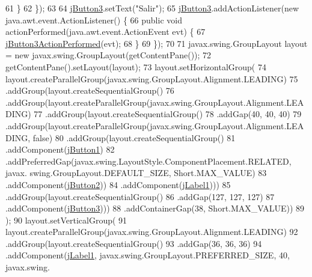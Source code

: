 \begin{DoxyCode}
61             \}
62         \});
63 
64         \mbox{\hyperlink{class_r_m_i_1_1_modulo_control_af7702c5fb7079fd87c45617ca34997d2}{jButton3}}.setText(\textcolor{stringliteral}{"Salir"});
65         \mbox{\hyperlink{class_r_m_i_1_1_modulo_control_af7702c5fb7079fd87c45617ca34997d2}{jButton3}}.addActionListener(\textcolor{keyword}{new} java.awt.event.ActionListener() \{
66             \textcolor{keyword}{public} \textcolor{keywordtype}{void} actionPerformed(java.awt.event.ActionEvent evt) \{
67                 \mbox{\hyperlink{class_r_m_i_1_1_modulo_control_a1fa4d225beca82a6bdff229861d48ff1}{jButton3ActionPerformed}}(evt);
68             \}
69         \});
70 
71         javax.swing.GroupLayout layout = \textcolor{keyword}{new} javax.swing.GroupLayout(getContentPane());
72         getContentPane().setLayout(layout);
73         layout.setHorizontalGroup(
74             layout.createParallelGroup(javax.swing.GroupLayout.Alignment.LEADING)
75             .addGroup(layout.createSequentialGroup()
76                 .addGroup(layout.createParallelGroup(javax.swing.GroupLayout.Alignment.LEADING)
77                     .addGroup(layout.createSequentialGroup()
78                         .addGap(40, 40, 40)
79                         .addGroup(layout.createParallelGroup(javax.swing.GroupLayout.Alignment.LEADING, \textcolor{keyword}{
      false})
80                             .addGroup(layout.createSequentialGroup()
81                                 .addComponent(\mbox{\hyperlink{class_r_m_i_1_1_modulo_control_a925d9d1d7eff319b2573c334a20e3da1}{jButton1}})
82                                 .addPreferredGap(javax.swing.LayoutStyle.ComponentPlacement.RELATED, javax.
      swing.GroupLayout.DEFAULT\_SIZE, Short.MAX\_VALUE)
83                                 .addComponent(\mbox{\hyperlink{class_r_m_i_1_1_modulo_control_aa5861c17fe034c546e4c455e4c86b1ad}{jButton2}}))
84                             .addComponent(\mbox{\hyperlink{class_r_m_i_1_1_modulo_control_a4b11316f909c6d5bda3ccd3d1d41ce92}{jLabel1}})))
85                     .addGroup(layout.createSequentialGroup()
86                         .addGap(127, 127, 127)
87                         .addComponent(\mbox{\hyperlink{class_r_m_i_1_1_modulo_control_af7702c5fb7079fd87c45617ca34997d2}{jButton3}})))
88                 .addContainerGap(38, Short.MAX\_VALUE))
89         );
90         layout.setVerticalGroup(
91             layout.createParallelGroup(javax.swing.GroupLayout.Alignment.LEADING)
92             .addGroup(layout.createSequentialGroup()
93                 .addGap(36, 36, 36)
94                 .addComponent(\mbox{\hyperlink{class_r_m_i_1_1_modulo_control_a4b11316f909c6d5bda3ccd3d1d41ce92}{jLabel1}}, javax.swing.GroupLayout.PREFERRED\_SIZE, 40, javax.swing.

\end{DoxyCode}
